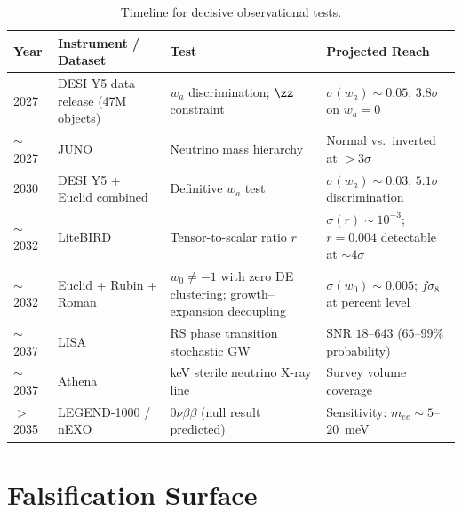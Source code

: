 \begin{table}[h!]
\caption{Timeline for decisive observational tests.}
\label{tab:pred-timeline}
\small
\renewcommand{\arraystretch}{1.25}
\begin{tabular}{@{}p{1.5cm}p{4.5cm}p{4.5cm}p{4.5cm}@{}}
\toprule
\textbf{Year} & \textbf{Instrument / Dataset} & \textbf{Test} & \textbf{Projected Reach} \\
\midrule

2027 &
DESI Y5 data release (47M objects) &
$w_a$ discrimination; $\zz$ constraint &
$\sigma(w_a) \sim 0.05$; $3.8\sigma$ on $w_a = 0$ \\

$\sim$2027 &
JUNO &
Neutrino mass hierarchy &
Normal vs.\ inverted at $>3\sigma$ \\

2030 &
DESI Y5 + Euclid combined &
Definitive $w_a$ test &
$\sigma(w_a) \sim 0.03$; $5.1\sigma$ discrimination \\

$\sim$2032 &
LiteBIRD &
Tensor-to-scalar ratio $r$ &
$\sigma(r) \sim 10^{-3}$; $r = 0.004$ detectable at $\sim 4\sigma$ \\

$\sim$2032 &
Euclid + Rubin + Roman &
$w_0 \neq -1$ with zero DE clustering; growth--expansion decoupling &
$\sigma(w_0) \sim 0.005$; $f\sigma_8$ at percent level \\

$\sim$2037 &
LISA &
RS phase transition stochastic GW &
SNR $18$--$643$ ($65$--$99\%$ probability) \\

$\sim$2037 &
Athena &
keV sterile neutrino X-ray line &
Survey volume coverage \\

$>$2035 &
LEGEND-1000 / nEXO &
$0\nu\beta\beta$ (null result predicted) &
Sensitivity: $m_{ee} \sim 5$--$20$~meV \\

\bottomrule
\end{tabular}
\end{table}

\section{Falsification Surface}
\label{app:pred-falsification}

